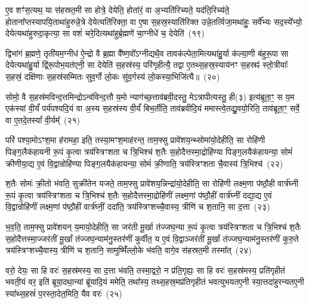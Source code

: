 ए॒व शꣳ॑स॒त्यथ॒ या स॑हस्रत॒मी सा होत्रे॒ देयेति॒ होता॑रं॒ वा अ॒भ्यति॑रिच्यते॒ यद॑ति॒रिच्य॑ते॒ होताना᳚प्तस्यापयि॒ता\-था॑हुरुन्ने॒त्रे देयेत्यति॑रिक्ता॒ वा ए॒षा स॒हस्र॒स्याति॑रिक्त उन्ने॒तर्त्विजा॒मथा॑हुः॒ सर्वे᳚भ्यः सद॒स्ये᳚भ्यो॒ देयेत्यथा॑हुरुदा॒कृत्या॒ सा वशं॑ चरे॒दित्यथा॑हुर्ब्र॒ह्मणे॑ चा॒ग्नीधे॑ च॒ देयेति॑~(१९)\ip

द्विभा॑गं ब्र॒ह्मणे॒ तृती॑यम॒ग्नीध॑ ऐ॒न्द्रो वै ब्र॒ह्मा वै᳚ष्ण॒वो᳚\-ऽग्नीद्यथै॒व तावक॑ल्पेता॒मित्यथा॑हु॒र्या क॑ल्या॒णी ब॑हुरू॒पा सा देयेत्यथा॑हु॒र्या द्वि॑रू॒पोभ॒यत॑एनी॒ सा देयेति॑ स॒हस्र॑स्य॒ परि॑गृहीत्यै॒ तद्वा ए॒तथ्स॒हस्र॒स्याय॑नꣳ स॒हस्रꣴ॑ स्तो॒त्रीयाः᳚ स॒हस्रं॒ दक्षि॑णाः स॒हस्र॑सम्मितः सुव॒र्गो लो॒कः सु॑व॒र्गस्य॑ लो॒कस्या॒भिजि॑त्यै॥~(२०)\ip

{\anuvakamend[{अ॒ब्र॒वी॒च्च॒ तद॒न्तरि॑क्षन्ददात्यच्छावा॒कश्च॒ देयेति॑ स॒प्तच॑त्वारिꣳशच्च}]}

सोमो॒ वै स॒हस्र॑मविन्द॒त्तमिन्द्रो\-ऽन्व॑विन्द॒त्तौ य॒मो न्याग॑च्छ॒त्ताव॑ब्रवी॒दस्तु॒ मे\-ऽत्रापीत्यस्तु॒ ही(३) इत्य॑ब्रूता॒ꣳ॒ स य॒म एक॑स्यां वी॒र्यं॑ पर्य॑पश्यदि॒यं वा अ॒स्य स॒हस्र॑स्य वी॒र्यं॑ बिभ॒र्तीति॒ ताव॑ब्रवीदि॒यं ममास्त्वे॒तद्यु॒वयो॒रिति॒ ताव॑ब्रूता॒ꣳ॒ सर्वे॒ वा ए॒तदे॒तस्यां᳚ वी॒र्यम्᳚~(२१)\ip

परि॑ पश्या॒मो\-ऽꣳश॒मा ह॑रामहा॒ इति॒ तस्या॒मꣳश॒माह॑रन्त॒ ताम॒फ्सु प्रावे॑शय॒न्थ्सोमा॑यो॒देहीति॒ सा रोहि॑णी पिङ्ग॒लैक॑हायनी रू॒पं कृ॒त्वा त्रय॑स्त्रिꣳशता च त्रि॒भिश्च॑ श॒तैः स॒होदैत्तस्मा॒द्रोहि॑ण्या पिङ्ग॒लयैक॑हायन्या॒ सोमं॑ क्रीणीया॒द्य ए॒वं वि॒द्वान्रोहि॑ण्या पिङ्ग॒लयैक॑हायन्या॒ सोमं॑ क्री॒णाति॒ त्रय॑स्त्रिꣳशता चै॒वास्य॑ त्रि॒भिश्च॑~(२२)\ip

श॒तैः सोमः॑ क्री॒तो भ॑वति॒ सुक्री॑तेन यजते॒ ताम॒फ्सु प्रावे॑शय॒न्निन्द्रा॑यो॒देहीति॒ सा रोहि॑णी लक्ष्म॒णा प॑ष्ठौ॒ही वार्त्र॑घ्नी रू॒पं कृ॒त्वा त्रय॑स्त्रिꣳशता च त्रि॒भिश्च॑ श॒तैः स॒होदैत्तस्मा॒द्रोहि॑णीं लक्ष्म॒णां प॑ष्ठौ॒हीं वार्त्र॑घ्नीं दद्या॒द्य ए॒वं वि॒द्वान्रोहि॑णीं लक्ष्म॒णां प॑ष्ठौ॒हीं वार्त्र॑घ्नीं॒ ददा॑ति॒ त्रय॑स्त्रिꣳशच्चै॒वास्य॒ त्रीणि॑ च श॒तानि॒ सा द॒त्ता~(२३)\ip

भ॒व॒ति॒ ताम॒फ्सु प्रावे॑शयन् य॒मायो॒देहीति॒ सा जर॑ती मू॒र्खा त॑ज्जघ॒न्या रू॒पं कृ॒त्वा त्रय॑स्त्रिꣳशता च त्रि॒भिश्च॑ श॒तैः स॒होदैत्तस्मा॒ज्जर॑तीं मू॒र्खां त॑ज्जघ॒न्याम॑नु॒स्तर॑णीं कुर्वीत॒ य ए॒वं वि॒द्वाञ्जर॑तीं मू॒र्खां त॑ज्जघ॒न्याम॑नु॒स्तर॑णीं कुरु॒ते त्रय॑स्त्रिꣳशच्चै॒वास्य॒ त्रीणि॑ च श॒तानि॒ सामुष्मिँ॑ल्लो॒के भ॑वति॒ वागे॒व स॑हस्रत॒मी तस्मा᳚त्~(२४)\ip

वरो॒ देयः॒ सा हि वरः॑ स॒हस्र॑मस्य॒ सा द॒त्ता भ॑वति॒ तस्मा॒द्वरो॒ न प्र॑ति॒गृह्यः॒ सा हि वरः॑ स॒हस्र॑मस्य॒ प्रति॑गृहीतं भवती॒यं वर॒ इति॑ ब्रूया॒दथा॒न्यां ब्रू॑यादि॒यं ममेति॒ तथा᳚स्य॒ तथ्स॒हस्र॒मप्र॑तिगृहीतं भवत्युभयतए॒नी स्या॒त्तदा॑हुरन्यत\-ए॒नी स्या᳚थ्स॒हस्रं॑ प॒रस्ता॒देत॒मिति॒ यैव वरः॑~(२५)\ip

